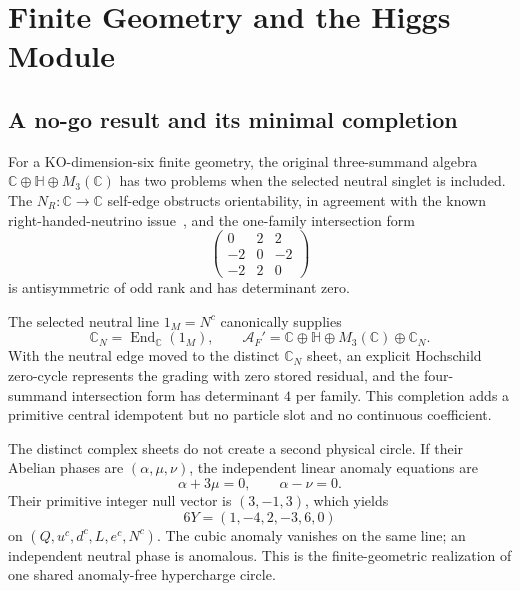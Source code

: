 \documentclass[11pt]{article}
\newcommand{\C}{\mathbb{C}}
\newcommand{\cA}{\mathcal{A}}
\newcommand{\End}{\operatorname{End}}
\begin{document}
\section{Finite Geometry and the Higgs Module}

\subsection{A no-go result and its minimal completion}

For a KO-dimension-six finite geometry, the original three-summand algebra
$\C\oplus\mathbb H\oplus M_3(\C)$ has two problems when the selected neutral singlet is included.
The $N_R:\C\!\to\!\C$ self-edge obstructs orientability, in agreement with the known
right-handed-neutrino issue~\cite{Stephan2006}, and the one-family intersection form
\begin{equation}
\begin{pmatrix}
0&2&2\\[-1mm]
-2&0&-2\\[-1mm]
-2&2&0
\end{pmatrix}
\end{equation}
is antisymmetric of odd rank and has determinant zero.

The selected neutral line $1_M=N^c$ canonically supplies
\begin{equation}
\C_N=\End_{\C}(1_M),\qquad
\cA_F'=\C\oplus\mathbb H\oplus M_3(\C)\oplus\C_N.
\end{equation}
With the neutral edge moved to the distinct $\C_N$ sheet, an explicit Hochschild zero-cycle
represents the grading with zero stored residual, and the four-summand intersection form has
determinant $4$ per family.  This completion adds a primitive central idempotent but no particle
slot and no continuous coefficient.

The distinct complex sheets do not create a second physical circle.  If their Abelian phases are
$(\alpha,\mu,\nu)$, the independent linear anomaly equations are
\begin{equation}
\alpha+3\mu=0,\qquad \alpha-\nu=0.
\end{equation}
Their primitive integer null vector is $(3,-1,3)$, which yields
\begin{equation}
6Y=(1,-4,2,-3,6,0)
\end{equation}
on $(Q,u^c,d^c,L,e^c,N^c)$.  The cubic anomaly vanishes on the same line; an independent neutral
phase is anomalous.  This is the finite-geometric realization of one shared anomaly-free
hypercharge circle.
\end{document}
